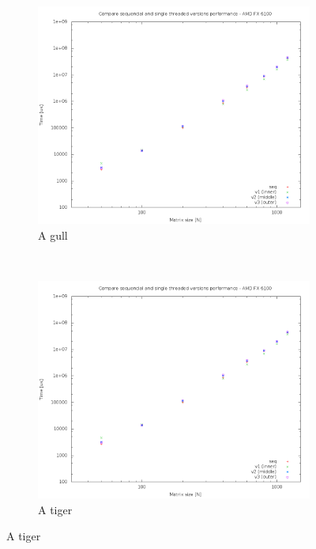 \documentclass[a4paper, 12pt]{article}
\begin{document}
\begin{figure}
    \centering
    \begin{subfigure}[b]{0.3\textwidth}
        \includegraphics[width=\textwidth]{cmp_single_thread_HAL}
        \caption{A gull}
        \label{fig:gull}
    \end{subfigure}%
    ~ %
    \begin{subfigure}[b]{0.3\textwidth}
        \includegraphics[width=\textwidth]{cmp_single_thread_HAL}
        \caption{A tiger}

\end{subfigure}
\end{figure}
\end{document}

